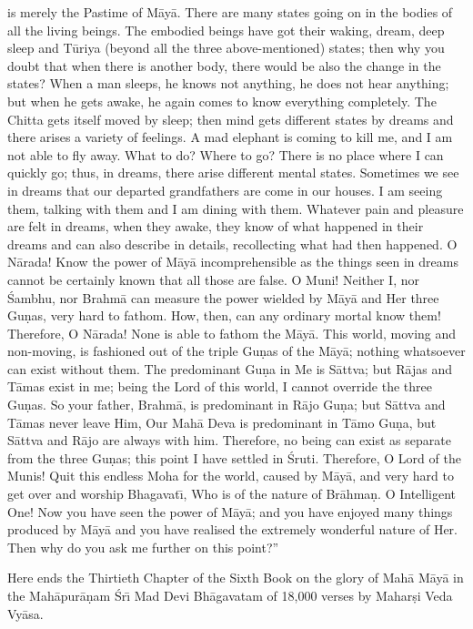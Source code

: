 is merely the Pastime of M\=ay\=a. There are many states going on in the bodies of all the living beings. The embodied beings have got their waking, dream, deep sleep and T\=uriya (beyond all the three above-mentioned) states; then why you doubt that when there is another body, there would be also the change in the states? When a man sleeps, he knows not anything, he does not hear anything; but when he gets awake, he again comes to know everything completely. The Chitta gets itself moved by sleep; then mind gets different states by dreams and there arises a variety of feelings. A mad elephant is coming to kill me, and I am not able to fly away. What to do? Where to go? There is no place where I can quickly go; thus, in dreams, there arise different mental states. Sometimes we see in dreams that our departed grandfathers are come in our houses. I am seeing them, talking with them and I am dining with them. Whatever pain and pleasure are felt in dreams, when they awake, they know of what happened in their dreams and can also describe in details, recollecting what had then happened. O N\=arada! Know the power of M\=ay\=a incomprehensible as the things seen in dreams cannot be certainly known that all those are false. O Muni! Neither I, nor \'Sambhu, nor Brahm\=a can measure the power wielded by M\=ay\=a and Her three Gu\d{n}as, very hard to fathom. How, then, can any ordinary mortal know them! Therefore, O N\=arada! None is able to fathom the M\=ay\=a. This world, moving and non-moving, is fashioned out of the triple Gu\d{n}as of the M\=ay\=a; nothing whatsoever can exist without them. The predominant Gu\d{n}a in Me is S\=attva; but R\=ajas and T\=amas exist in me; being the Lord of this world, I cannot override the three Gu\d{n}as. So your father, Brahm\=a, is predominant in R\=ajo Gu\d{n}a; but S\=attva and T\=amas never leave Him, Our Mah\=a Deva is predominant in T\=amo Gu\d{n}a, but S\=attva and R\=ajo are always with him. Therefore, no being can exist as separate from the three Gu\d{n}as; this point I have settled in \'Sruti. Therefore, O Lord of the Munis! Quit this endless Moha for the world, caused by M\=ay\=a, and very hard to get over and worship Bhagavat\={\i}, Who is of the nature of Br\=ahma\d{n}. O Intelligent One! Now you have seen the power of M\=ay\=a; and you have enjoyed many things produced by M\=ay\=a and you have realised the extremely wonderful nature of Her. Then why do you ask me further on this point?''

Here ends the Thirtieth Chapter of the Sixth Book on the glory of Mah\=a M\=ay\=a in the Mah\=apur\=a\d{n}am \'Sr\={\i} Mad Devi Bh\=agavatam of 18,000 verses by Mahar\d{s}i Veda Vy\=asa.




